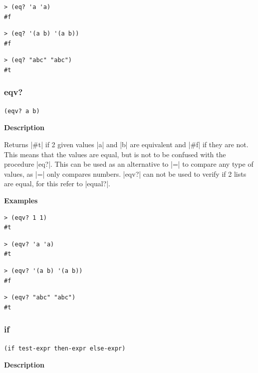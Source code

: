 \documentclass[a4paper]{article}
\begin{document}
\begin{lstlisting}
> (eq? 'a 'a)
#f
\end{lstlisting}

\begin{lstlisting}
> (eq? '(a b) '(a b))
#f
\end{lstlisting}

\begin{lstlisting}
> (eq? "abc" "abc")
#t
\end{lstlisting}


\subsubsection{eqv?}

\begin{lstlisting}[frame=none]
(eqv? a b)
\end{lstlisting}

\textbf{Description}

Returns |#t| if 2 given values |a| and |b| are equivalent and |#f| if they are not. This means that the values are equal, but is not to be confused with the procedure |eq?|. This can be used as an alternative to |=| to compare any type of values, as |=| only compares numbers. |eqv?| can not be used to verify if 2 lists are equal, for this refer to |equal?|.

\textbf{Examples}

\begin{lstlisting}
> (eqv? 1 1)
#t
\end{lstlisting}

\begin{lstlisting}
> (eqv? 'a 'a)
#t
\end{lstlisting}

\begin{lstlisting}
> (eqv? '(a b) '(a b))
#f
\end{lstlisting}

\begin{lstlisting}
> (eqv? "abc" "abc")
#t
\end{lstlisting}

\subsubsection{if}

\begin{lstlisting}[frame=none]
(if test-expr then-expr else-expr)
\end{lstlisting}

\textbf{Description}
\end{document}
